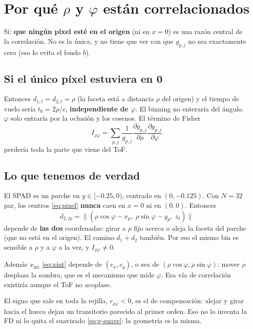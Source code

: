\documentclass[11pt,a4paper]{article}
\newcommand{\vect}[1]{\boldsymbol{#1}}
\theoremstyle{definition}
\begin{document}
\section{Por qu\'e $\rho$ y $\varphi$ est\'an correlacionados}
\label{sec:corr}

S\'i: \textbf{que ning\'un p\'ixel est\'e en el origen} (ni en $x=0$) es una
raz\'on central de la correlaci\'on. No es la \'unica, y no tiene que ver con
que $g_{p,j}$ no sea exactamente cero (eso lo evita el fondo $b$).

\subsection{Si el \'unico p\'ixel estuviera en $\vect 0$}

Entonces $d_{1,t}=d_{2,t}=\rho$ (la faceta est\'a a distancia $\rho$ del
origen) y el tiempo de vuelo ser\'ia $t_0=2\rho/c$, \textbf{independiente de
$\varphi$}. El binning no enterar\'ia del \'angulo. $\varphi$ solo entrar\'ia
por la oclusi\'on y los cosenos. El t\'ermino de Fisher
%
\begin{equation}
I_{\rho\varphi}
=
\sum_{p,j}
\frac1{g_{p,j}}
\frac{\partial g_{p,j}}{\partial\rho}
\frac{\partial g_{p,j}}{\partial\varphi}
\end{equation}
%
perder\'ia toda la parte que viene del ToF.

\subsection{Lo que tenemos de verdad}

El SPAD es un parche en $y\in[-0.25,0)$, centrado en $(0,-0.125)$. Con $N=32$
par, los centros \eqref{eq:pixel} \textbf{nunca} caen en $x=0$ ni en
$(0,0)$. Entonces
%
\[
d_{2,tp}
=
\bigl\lVert
(\rho\cos\varphi-x_p,\;\rho\sin\varphi-y_p,\;z_t)
\bigr\rVert
\]
%
depende de \textbf{las dos} coordenadas: girar a $\rho$ fijo acerca o aleja la
faceta del parche (que no est\'a en el origen). El camino $d_1+d_2$ tambi\'en.
Por eso el mismo bin es sensible a $\rho$ y a $\varphi$ a la vez, y
$I_{\rho\varphi}\neq0$.

Adem\'as $x_{\mathrm{int}}$ \eqref{eq:xint} depende de $(c_x,c_y)$, o sea de
$(\rho\cos\varphi,\rho\sin\varphi)$: mover $\rho$ desplaza la sombra, que es el
mecanismo que mide $\varphi$. Esa v\'ia de correlaci\'on existir\'ia aunque el
ToF no acoplase.

El signo que sale en toda la rejilla, $r_{\rho\varphi}<0$, es el de
compensaci\'on: alejar y girar hacia el hueco dejan un transitorio parecido al
primer orden. Eso no lo inventa la FD ni lo quita el suavizado
\eqref{eq:g-suave}: la geometr\'ia es la misma.
\end{document}
